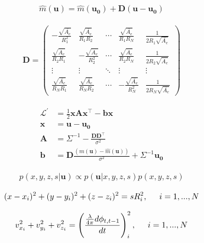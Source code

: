 \documentclass{beamer}
\providecommand{\brak}[1]{\ensuremath{\left(#1\right)}}
\begin{document}
\begin{frame}{}
    \begin{align}
        \hat{m}(\boldsymbol{u})=\hat{m}(\boldsymbol{u_0})+\boldsymbol{D}(\boldsymbol{u}-\boldsymbol{u_0})
    \end{align}
\end{frame}
\begin{frame}{}
    \begin{align}
        \boldsymbol{D} = \begin{pmatrix}
-\frac{\sqrt{\bar{A_e}}}{R_1^2} & \frac{\sqrt{\bar{A_e}}}{R_1R_2}      & \cdots & \frac{\sqrt{\bar{A_e}}}{R_1R_N}       & \frac{1}{2R_1\sqrt{\bar{A_e}}} \\
\frac{\sqrt{\bar{A_e}}}{R_2R_1}     & -\frac{\sqrt{\bar{A_e}}}{R_2^2} & \cdots & \frac{\sqrt{\bar{A_e}}}{R_2R_N}      & \frac{1}{2R_2\sqrt{\bar{A_e}}}\\
\vdots & \vdots & \ddots & \vdots  & \vdots  \\
 \frac{\sqrt{\bar{A_e}}}{R_NR_1}    & \frac{\sqrt{\bar{A_e}}}{R_NR_2}     & \cdots & -\frac{\sqrt{\bar{A_e}}}{R_N^2}&\frac{1}{2R_N\sqrt{\bar{A_e}}}  
\end{pmatrix}
    \end{align}
\end{frame}
\begin{frame}{}
\begin{align}
   \mathcal{L}^{\prime}&=\frac{1}{2}\boldsymbol{x}\boldsymbol{A}\boldsymbol{x}^{\top}-\boldsymbol{b}\boldsymbol{x}\\
   \boldsymbol{x}&= \boldsymbol{u}-\boldsymbol{u_0}\\
   \boldsymbol{A}&= \Sigma^{-1}-\frac{\boldsymbol{D}\boldsymbol{D}^{\top}}{\sigma^2}\\
   \boldsymbol{b}&=\boldsymbol{D}\frac{\brak{m(\boldsymbol{u})-\hat{m}(\boldsymbol{u})}}{\sigma^2}+\Sigma^{-1}\boldsymbol{u_0}
   \end{align}
\end{frame}
\begin{frame}{}
   \begin{align}
       \mathit{p}(x,y,z,s|\boldsymbol{u})\propto \mathit{p}(\boldsymbol{u}|x,y,z,s)\mathit{p}(x,y,z,s)
   \end{align} 
\end{frame}
\begin{frame}{}
\begin{align}
    (x-x_i)^2+(y-y_i)^2+(z-z_i)^2=sR_i^2,\hspace{0.5cm}
    i=1,...,N
    \end{align}
\end{frame}
\begin{frame}{}
    \begin{align}
        v_{x_i}^2+v_{y_i}^2+v_{z_i}^2= \brak{\frac{\frac{\lambda}{4\pi}d\phi_{t,t-1}}{dt}}_{i}^2,\hspace{0.5cm} i=1,...,N
    \end{align}
\end{frame}
\end{document}

